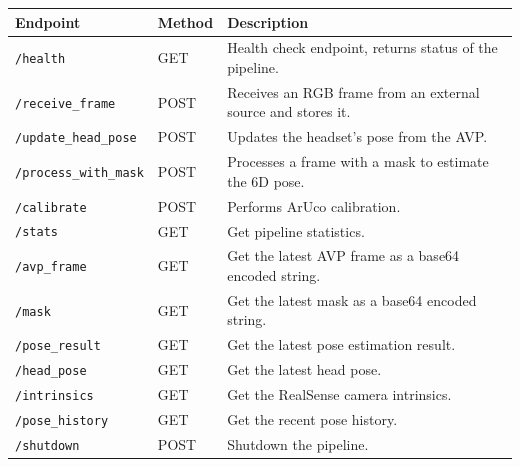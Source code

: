 \documentclass{article}
\begin{document}
\begin{longtable}{| >{\raggedright\arraybackslash}p{} | >{\raggedright\arraybackslash}p{} | >{\raggedright\arraybackslash}p{} |}
\hline
\textbf{Endpoint} & \textbf{Method} & \textbf{Description} \\
\hline
\endhead

\texttt{/health} & GET & Health check endpoint, returns status of the pipeline. \\
\hline
\texttt{/receive\_frame} & POST & Receives an RGB frame from an external source and stores it. \\
\hline
\texttt{/update\_head\_pose} & POST & Updates the headset's pose from the AVP. \\
\hline
\texttt{/process\_with\_mask} & POST & Processes a frame with a mask to estimate the 6D pose. \\
\hline
\texttt{/calibrate} & POST & Performs ArUco calibration. \\
\hline
\texttt{/stats} & GET & Get pipeline statistics. \\
\hline
\texttt{/avp\_frame} & GET & Get the latest AVP frame as a base64 encoded string. \\
\hline
\texttt{/mask} & GET & Get the latest mask as a base64 encoded string. \\
\hline
\texttt{/pose\_result} & GET & Get the latest pose estimation result. \\
\hline
\texttt{/head\_pose} & GET & Get the latest head pose. \\
\hline
\texttt{/intrinsics} & GET & Get the RealSense camera intrinsics. \\
\hline
\texttt{/pose\_history} & GET & Get the recent pose history. \\
\hline
\texttt{/shutdown} & POST & Shutdown the pipeline. \\
\hline
\end{longtable}
\end{document}
